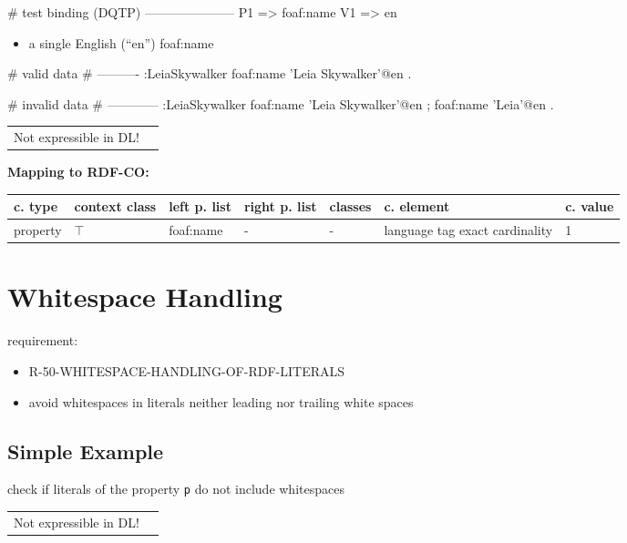 \documentclass{llncs}
\newcommand{\ms}[1]{\texttt{#1}}
\newenvironment{gcotable}{
  \scriptsize
  \sffamily
  \vspace{0cm}
	\begin{center}
	\textbf{\vspace{0.4cm}Mapping to RDF-CO:} \\
  \begin{tabular}{l|l|l|l|l|l|l}
	\hline
  \textbf{c. type} & \textbf{context class} & \textbf{left p. list} & \textbf{right p. list} & \textbf{classes} & \textbf{c. element} & \textbf{c. value} \\
  \hline

}{
  \hline
  \end{tabular}
	\end{center}
}
\newenvironment{DL}{
  \vspace{0cm}
	\begin{center}
  \begin{tabular}{r l}

}{
  \end{tabular}
	\end{center}
}
\begin{document}
\begin{ex}
# test binding (DQTP)
---------------------
P1 => foaf:name
V1 => en
\end{ex}

\begin{itemize}
	\item a single English (“en”) foaf:name
\end{itemize}

\begin{ex}
# valid data
# ----------
:LeiaSkywalker
    foaf:name 'Leia Skywalker'@en .
\end{ex}

\begin{ex}
# invalid data
# ------------
:LeiaSkywalker
    foaf:name 'Leia Skywalker'@en ;
    foaf:name 'Leia'@en .
\end{ex}

\begin{DL}
Not expressible in DL!
\end{DL}

\begin{gcotable}
property & $\top$ & foaf:name & - & - & language tag exact cardinality & 1 \\
\end{gcotable}

\section{Whitespace Handling}

requirement:

\begin{itemize}
	\item R-50-WHITESPACE-HANDLING-OF-RDF-LITERALS
\end{itemize}

\begin{itemize}
	\item avoid whitespaces in literals neither leading nor trailing white spaces
\end{itemize}

\subsection{Simple Example}

check if literals of the property \ms{p} do not include whitespaces

\begin{DL}
Not expressible in DL!
\end{DL}
\end{document}
